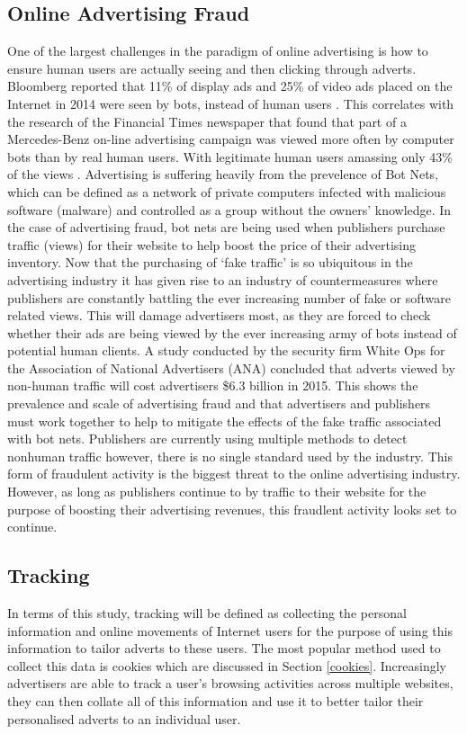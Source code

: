 \documentclass{article}
\begin{document}
\subsection{Online Advertising Fraud}
One of the largest challenges in the paradigm of online advertising is how to ensure human users are actually seeing and then clicking through adverts. Bloomberg reported that 11\% of display ads and 25\% of video ads placed on the Internet in 2014 were seen by bots, instead of human users \parencite{bloomFraud}. This correlates with the research of the Financial Times newspaper that found that part of a Mercedes-Benz on-line advertising campaign was viewed more often by computer bots than by real human users. With legitimate human users amassing only 43\% of the views \parencite{mercFraud}. Advertising is suffering heavily from the prevelence of Bot Nets, which can be defined as a network of private computers infected with malicious software (malware)  and controlled as a group without the owners' knowledge. In the case of advertising fraud, bot nets are being used when publishers purchase traffic (views) for their website to help boost the price of their advertising inventory. Now that the purchasing of `fake traffic' is so ubiquitous in the advertising industry it has given rise to an industry of countermeasures \parencite{bloomFraud} where publishers are constantly battling the ever increasing number of fake or software related views. This will damage advertisers most, as they are forced to check whether their ads are being viewed by the ever increasing army of bots instead of potential human clients. A study conducted by the security firm White Ops for the Association of National Advertisers (ANA) concluded that adverts viewed by non-human traffic will cost advertisers \$6.3 billion in 2015. This shows the prevalence and scale of advertising fraud and that advertisers and publishers must work together to help to mitigate the effects of the fake traffic associated with bot nets. Publishers are currently using multiple methods to detect nonhuman traffic however, there is no single standard used by the industry. This form of fraudulent activity is the biggest threat to the online advertising industry. However, as long as publishers continue to by traffic to their website for the purpose of boosting their advertising revenues, this fraudlent activity looks set to continue. 


\subsection{Tracking}
In terms of this study, tracking will be defined as collecting the personal information and online movements of Internet users for the purpose of using this information to tailor adverts to these users. The most popular method used to collect this data is cookies which are discussed in Section \ref{cookies}. Increasingly advertisers are able to track a user's browsing activities across multiple websites, they can then collate all of this information and use it to better tailor their personalised adverts to an individual user. 
\end{document}
